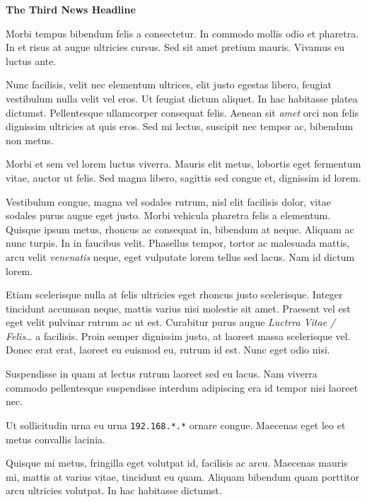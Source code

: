 \documentclass[11pt, letterpaper]{article}
\newcommand{\heading}[2]{ %
\vspace{#2} %
{\begin{center}\Large\textbf{#1}\end{center}} %
\vspace{#2} %
}
\begin{document}
\begin{minipage}[t]{.66\linewidth} %

\hypertarget{thirdnews}{\heading{The Third News Headline}{6pt}} %

\begin{multicols}{2} %
Morbi tempus bibendum felis a consectetur. In commodo mollis odio et pharetra. In et risus at augue ultricies cursus. Sed sit amet pretium mauris. Vivamus eu luctus ante.

Nunc facilisis, velit nec elementum ultrices, elit justo egestas libero, feugiat vestibulum nulla velit vel eros. Ut feugiat dictum aliquet. In hac habitasse platea dictumst. Pellentesque ullamcorper consequat felis. Aenean sit \textsl{amet} orci non felis dignissim ultricies at quis eros. Sed mi lectus, suscipit nec tempor ac, bibendum non metus.

Morbi et sem vel lorem luctus viverra. Mauris elit metus, lobortis eget fermentum vitae, auctor ut felis. Sed magna libero, sagittis sed congue et, dignissim id lorem.

Vestibulum congue, magna vel sodales rutrum, nisl elit facilisis dolor, vitae sodales purus augue eget justo. Morbi vehicula pharetra felis a elementum. Quisque ipsum metus, rhoncus ac consequat in, bibendum at neque. Aliquam ac nunc turpis. In in faucibus velit. Phasellus tempor, tortor ac malesuada mattis, arcu velit \textsl{venenatis} neque, eget vulputate lorem tellus sed lacus. Nam id dictum lorem.

Etiam scelerisque nulla at felis ultricies eget rhoncus justo scelerisque. Integer tincidunt accumsan neque, mattis varius nisi molestie sit amet. Praesent vel est eget velit pulvinar rutrum ac ut est. Curabitur purus augue \textsl{Luctrra Vitae / Felis\dots}  a facilisis. Proin semper dignissim justo, at laoreet massa scelerisque vel. Donec erat erat, laoreet eu euismod eu, rutrum id est. Nunc eget odio nisi.

Suspendisse in quam at lectus rutrum laoreet sed eu lacus. Nam viverra commodo pellentesque suspendisse interdum adipiscing era id tempor nisi laoreet nec.

Ut sollicitudin urna eu urna  \texttt{192.168.*.*} ornare congue. Maecenas eget leo et metus convallis lacinia.

Quisque mi metus, fringilla eget volutpat id, facilisis ac arcu. Maecenas mauris mi, mattis at varius vitae, tincidunt eu quam. Aliquam bibendum quam porttitor arcu ultricies volutpat. In hac habitasse dictumst.


\end{multicols}
\end{minipage}
\end{document}
